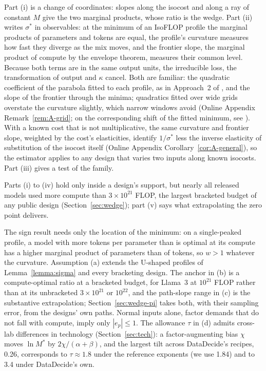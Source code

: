 Part (i) is a change of coordinates: slopes along the isocost and along a ray of constant $M$ give the two marginal
products, whose ratio is the wedge. Part (ii) writes $\sigma^*$ in observables: at the minimum of
an IsoFLOP profile the marginal products of parameters and tokens are equal, the profile's curvature measures how fast
they diverge as the mix moves, and the frontier slope, the marginal
product of compute by the envelope theorem, measures their common level. Because both terms are in the same output
units, the irreducible loss, the transformation of output and $\kappa$ cancel. Both are familiar: the quadratic
coefficient of the parabola fitted to each profile, as in Approach~2 of \citet{hoffmann2022training}, and the slope of
the frontier through the minima; quadratics fitted over wide grids overstate the curvature slightly, which
narrow windows avoid (Online Appendix Remark~\ref{rem:A-grid}; on the corresponding shift of the fitted minimum, see
\citealp{czech2026problems}). With a known cost that is not multiplicative, the same curvature and frontier slope,
weighted by the cost's elasticities, identify $1/\sigma^*$ less the inverse elasticity of substitution of the isocost
itself (Online Appendix Corollary~\ref{cor:A-general}), so the estimator applies to any design that varies two inputs
along known isocosts. Part (iii) gives a test of the family.

Parts (i) to (iv) hold only inside a design's support, but nearly all released models used more compute than
$3\times10^{21}$ FLOP, the largest bracketed budget of any public design (Section~\ref{sec:wedge}); part (v) says what
extrapolating the zero point delivers.

The sign result needs only the location of the minimum: on a single-peaked profile, a model with more tokens per
parameter than is optimal at its compute has a higher marginal product of parameters than of tokens, so $w>1$ whatever
the curvature. Assumption (a) extends the U-shaped profiles of
Lemma~\ref{lemma:sigma} and every bracketing design. The anchor in (b) is a compute-optimal ratio at a bracketed budget,
for Llama~3 at $10^{21}$ FLOP rather than at its unbracketed $3\times10^{21}$ or $10^{22}$, and the path-slope range in
(c) is the substantive extrapolation; Section~\ref{sec:wedge-pi} takes both, with their sampling error, from the designs'
own paths. Normal inputs alone, factor demands that do not fall with compute, imply only
$|e_p|\le1$. The allowance $\tau$ in (d) admits
cross-lab differences in technology (Section~\ref{sec:tech}): a factor-augmenting bias $\chi$ moves $\ln M^*$ by
$2\chi/(\alpha+\beta)$, and the largest tilt across DataDecide's recipes, 0.26,
corresponds to $\tau\approx1.8$ under the reference exponents (we use 1.84) and to 3.4 under DataDecide's own.

